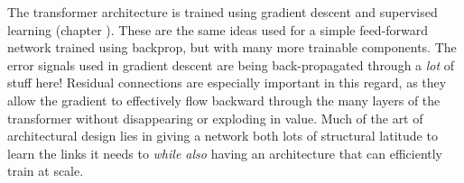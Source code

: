 
The transformer architecture is trained using gradient descent and supervised
learning (chapter ). These are the same ideas used for a
simple feed-forward network trained using backprop, but with many more
trainable components. The error signals used in gradient descent are being
back-propagated through a \emph{lot} of stuff here! Residual connections are
especially important in this regard, as they allow the gradient to effectively flow
backward through the many layers of the transformer without disappearing or
exploding in value. Much of the art of
architectural design lies in giving a network both lots of structural latitude
to learn the links it needs to \emph{while also} having an architecture that can
efficiently train at scale.

